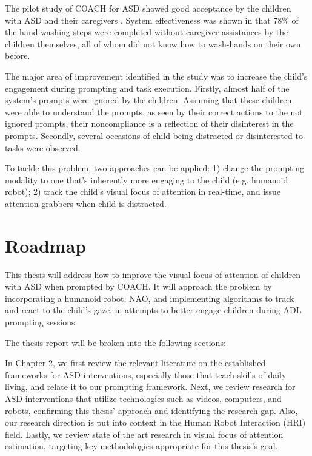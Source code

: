 \documentclass{ut-thesis}
\begin{document}
The pilot study of COACH for ASD showed good acceptance by the children with ASD and their caregivers \cite{bimbrahw2012investigating}.  System effectiveness was shown in that 78\% of the hand-washing steps were completed without caregiver assistances by the children themselves, all of whom did not know how to wash-hands on their own before.


The major area of improvement identified in the study was to increase the child's engagement during prompting and task execution.  Firstly, almost half of the system's prompts were ignored by the children.  Assuming that these children were able to understand the prompts, as seen by their correct actions to the not ignored prompts, their noncompliance is a reflection of their disinterest in the prompts.  Secondly, several occasions of child being distracted or disinterested to tasks were observed.


To tackle this problem, two approaches can be applied: 1) change the prompting modality to one that's inherently more engaging to the child (e.g. humanoid robot); 2) track the child's visual focus of attention in real-time, and issue attention grabbers when child is distracted.

\section{Roadmap}

This thesis will address how to improve the visual focus of attention of children with ASD when prompted by COACH.  It will approach the problem by incorporating a humanoid robot, NAO, and implementing algorithms to track and react to the child's gaze, in attempts to better engage children during ADL prompting sessions.


The thesis report will be broken into the following sections:


In Chapter 2, we first review the relevant literature on the established frameworks for ASD interventions, especially those that teach skills of daily living, and relate it to our prompting framework.  Next, we review research for ASD interventions that utilize technologies such as videos, computers, and robots, confirming this thesis' approach and identifying the research gap.  Also, our research direction is put into context in the Human Robot Interaction (HRI) field.  Lastly, we review state of the art research in visual focus of attention estimation, targeting key methodologies appropriate for this thesis's goal.
\end{document}
